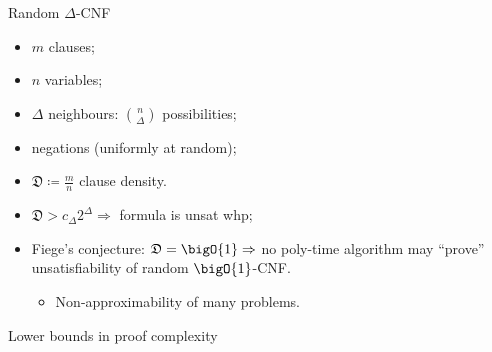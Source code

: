 \begin{frame}{Random $\Delta$-CNF}

    \begin{minipage}{0.38\linewidth}
        \centering
        
    \end{minipage}
    \begin{minipage}{0.58\linewidth}
        \begin{itemize}
            \item $m$ clauses;
            \item $n$ variables;
            \item $\Delta$ neighbours: $\binom{n}{\Delta}$ possibilities;
            \item negations (uniformly at random);
            \item $\mathfrak{D} \coloneqq \frac{m}{n}$ clause density.
        \end{itemize}
    \end{minipage}

    \pause
    \begin{itemize}
        \item $\mathfrak{D} > c_{\Delta} 2^{\Delta} \Rightarrow$ formula is unsat whp;
            \pause
        \item Fiege's conjecture: $\mathfrak{D} = \bigO{1} \Rightarrow$ no poly-time algorithm may
            ``prove'' unsatisfiability of random $\bigO{1}$-CNF.
            \begin{itemize}
                \item Non-approximability of many problems.
            \end{itemize}
    \end{itemize}

\end{frame}




\begin{frame}{Lower bounds in proof complexity}

    
\end{frame}